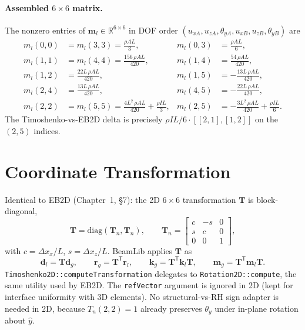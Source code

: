 \documentclass[11pt,a4paper]{article}
\newcommand{\bmath}[1]{\boldsymbol{#1}}
\begin{document}
\paragraph{Assembled $6\times 6$ matrix.}
The nonzero entries of $\bmath{m}_l \in \mathbb{R}^{6\times 6}$ in DOF order $(u_{xA}, u_{zA}, \theta_{yA}, u_{xB}, u_{zB}, \theta_{yB})$ are
\begin{align*}
m_l(0,0) &= m_l(3,3) = \tfrac{\rho A L}{3}, & m_l(0,3) &= \tfrac{\rho A L}{6}, \\
m_l(1,1) &= m_l(4,4) = \tfrac{156\,\rho A L}{420}, & m_l(1,4) &= \tfrac{54\,\rho A L}{420}, \\
m_l(1,2) &= \tfrac{22 L\,\rho A L}{420}, & m_l(1,5) &= -\tfrac{13 L\,\rho A L}{420}, \\
m_l(2,4) &= \tfrac{13 L\,\rho A L}{420}, & m_l(4,5) &= -\tfrac{22 L\,\rho A L}{420}, \\
m_l(2,2) &= m_l(5,5) = \tfrac{4 L^2\,\rho A L}{420} + \tfrac{\rho I L}{3}, & m_l(2,5) &= -\tfrac{3 L^2\,\rho A L}{420} + \tfrac{\rho I L}{6}.
\end{align*}
The Timoshenko-vs-EB2D delta is precisely $\rho I L / 6 \cdot [[2,1],[1,2]]$ on the $(2, 5)$ indices.

\section{Coordinate Transformation}

Identical to EB2D (Chapter~1, \S7): the 2D $6\times 6$ transformation $\bmath{T}$ is block-diagonal,
\[
\bmath{T} = \mathrm{diag}(\bmath{T}_n, \bmath{T}_n),
\qquad
\bmath{T}_n = \begin{bmatrix} c & -s & 0 \\ s & c & 0 \\ 0 & 0 & 1 \end{bmatrix},
\]
with $c = \Delta x_x / L$, $s = \Delta x_z / L$. BeamLib applies $\bmath{T}$ as
\[
\bmath{d}_l = \bmath{T}\bmath{d}_g, \qquad \bmath{r}_g = \bmath{T}^\mathsf{T}\bmath{r}_l, \qquad \bmath{k}_g = \bmath{T}^\mathsf{T}\bmath{k}_l\bmath{T}, \qquad \bmath{m}_g = \bmath{T}^\mathsf{T}\bmath{m}_l\bmath{T}.
\]
\texttt{Timoshenko2D::computeTransformation} delegates to \texttt{Rotation2D::compute}, the same utility used by EB2D. The \texttt{refVector} argument is ignored in 2D (kept for interface uniformity with 3D elements). No structural-vs-RH sign adapter is needed in 2D, because $T_n(2,2) = 1$ already preserves $\theta_y$ under in-plane rotation about $\hat{y}$.
\end{document}
